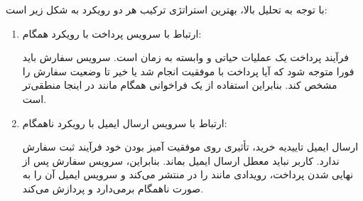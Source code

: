با توجه به تحلیل بالا، بهترین استراتژی ترکیب هر دو رویکرد به شکل زیر است:

\begin{enumerate}
    \item {ارتباط با سرویس پرداخت با رویکرد همگام:}

فرآیند پرداخت یک عملیات حیاتی و وابسته به زمان است. سرویس سفارش باید فورا متوجه شود که آیا پرداخت با موفقیت انجام شد یا خیر تا وضعیت سفارش را مشخص کند. بنابراین استفاده از یک فراخوانی همگام مانند  در اینجا منطقی‌تر است.

    
    \item {ارتباط با سرویس ارسال ایمیل با رویکرد ناهمگام:}

    ارسال ایمیل تاییدیه خرید، تأثیری روی موفقیت آمیز بودن خود فرآیند ثبت سفارش ندارد. کاربر نباید معطل ارسال ایمیل بماند. بنابراین، سرویس سفارش پس از نهایی شدن پرداخت، رویدادی مانند  را در  منتشر می‌کند و سرویس ایمیل آن را به صورت ناهمگام برمی‌دارد و پردازش می‌کند.
\end{enumerate}
